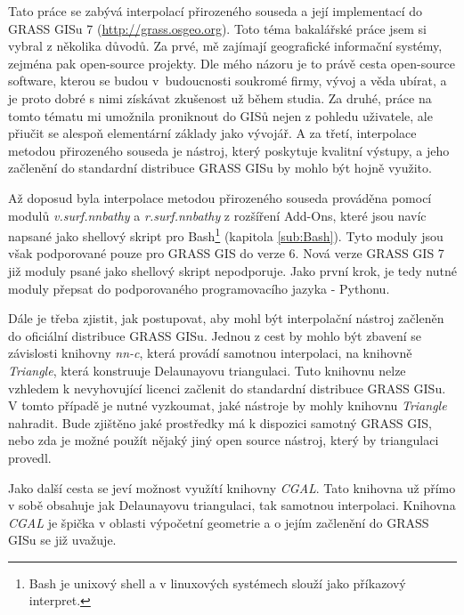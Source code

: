 \documentclass[12pt,a4paper]{article}
\begin{document}
\bigskip

Tato práce se zabývá interpolací přirozeného souseda a její
implementací do GRASS GISu 7 (\url{http://grass.osgeo.org}).
Toto téma bakalářské práce jsem si vybral z několika důvodů. Za prvé,
mě zajímají geografické informační systémy, zejména pak open-source
projekty. Dle mého názoru je to právě cesta open-source software,
kterou se budou v~budoucnosti soukromé firmy, vývoj a věda ubírat, a
je proto dobré s nimi získávat zkušenost už během studia. Za druhé,
práce na tomto tématu mi umožnila proniknout do GISů nejen z pohledu
uživatele, ale přiučit se alespoň elementární základy jako vývojář. A
za třetí, interpolace metodou přirozeného souseda je nástroj, který
poskytuje kvalitní výstupy, a jeho začlenění do standardní distribuce
GRASS GISu by mohlo být hojně využito.

Až doposud byla interpolace metodou přirozeného souseda prováděna
pomocí modulů \emph{v.surf.nnbathy} a \emph{r.surf.nnbathy} z
rozšíření Add-Ons, které jsou navíc napsané jako shellový skript pro Bash\footnote{Bash je unixový shell a v linuxových systémech slouží jako příkazový interpret.} (kapitola \ref{sub:Bash}). Tyto moduly jsou
však podporované pouze pro GRASS GIS do verze 6. Nová verze GRASS GIS
7 již moduly psané jako shellový skript nepodporuje. Jako první krok, je tedy
nutné moduly přepsat do podporovaného programovacího jazyka - Pythonu.

\newpage

Dále je třeba zjistit, jak postupovat, aby mohl být interpolační
nástroj začleněn do oficiální distribuce GRASS GISu. Jednou z cest by
mohlo být zbavení se závislosti knihovny \emph{nn-c}, která provádí
samotnou interpolaci, na knihovně \emph{Triangle}, která konstruuje
Delaunayovu triangulaci. Tuto knihovnu nelze vzhledem k nevyhovující
licenci začlenit do standardní distribuce GRASS GISu. V tomto případě
je nutné vyzkoumat, jaké nástroje by mohly knihovnu \emph{Triangle}
nahradit. Bude zjištěno jaké prostředky má k dispozici samotný GRASS
GIS, nebo zda je možné použít nějaký jiný open source nástroj, který
by triangulaci provedl.

Jako další cesta se jeví možnost využítí knihovny \emph{CGAL}. Tato
knihovna už přímo v sobě obsahuje jak Delaunayovu triangulaci, tak
samotnou interpolaci. Knihovna \emph{CGAL} je špička v oblasti
výpočetní geometrie a o jejím začlenění do GRASS GISu se již uvažuje.
\end{document}
